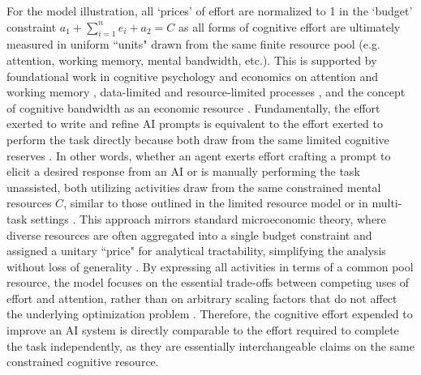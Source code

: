\documentclass[11pt]{article}
\theoremstyle{definition}
\theoremstyle{remark}
\begin{document}
For the model illustration, all `prices' of effort are normalized to 1 in the `budget' constraint $a_1 + \sum_{i=1}^{n} e_i + a_2 = C$ as all forms of cognitive effort are ultimately measured in uniform ``units" drawn from the same finite resource pool (e.g. attention, working memory, mental bandwidth, etc.). This is supported by foundational work in cognitive psychology and economics on attention and working memory \citep{kahneman1973attention, baddeley1992working}, data-limited and resource-limited processes \citep{norman1975data}, and the concept of cognitive bandwidth as an economic resource \citep{navon1979economy, caplin2016measuring, loewenstein2023economics}. Fundamentally, the effort exerted to write and refine AI prompts is equivalent to the effort exerted to perform the task directly because both draw from the same limited cognitive reserves \citep{zamfirescu2023johnny}. In other words, whether an agent exerts effort crafting a prompt to elicit a desired response from an AI or is manually performing the task unassisted, both utilizing activities draw from the same constrained mental resources $C$, similar to those outlined in the limited resource model \citep{norman1975data} or in multi-task settings \citep{borghini2012assessment}. This approach mirrors standard microeconomic theory, where diverse resources are often aggregated into a single budget constraint and assigned a unitary ``price" for analytical tractability, simplifying the analysis without loss of generality \citep{becker1965theory,varian1992microeconomic}. By expressing all activities in terms of a common pool resource, the model focuses on the essential trade-offs between competing uses of effort and attention, rather than on arbitrary scaling factors that do not affect the underlying optimization problem \citep{RePEc:oxp:obooks:9780195102680}. Therefore, the cognitive effort expended to improve an AI system is directly comparable to the effort required to complete the task independently, as they are essentially interchangeable claims on the same constrained cognitive resource.
\end{document}
